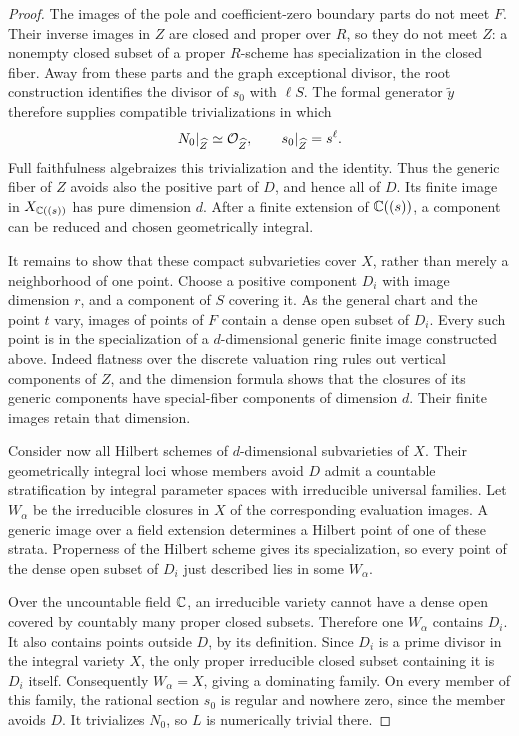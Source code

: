 \begin{proof}
The images of the pole and coefficient-zero boundary
parts do not meet $F$.  Their inverse images in $Z$ are
closed and proper over $R$, so they do not meet $Z$:
a nonempty closed subset of a proper $R$-scheme has
specialization in the closed fiber.  Away from these parts
and the graph exceptional divisor, the root construction
identifies the divisor of $s_0$ with $\ell S$.
The formal generator $\widetilde y$ therefore supplies
compatible trivializations in which
\[
 N_0|_{\widehat Z}\simeq\mathcal{O}_{\widehat Z},
 \qquad s_0|_{\widehat Z}=s^\ell.
\]
Full faithfulness algebraizes this trivialization and the
identity.  Thus the generic fiber of $Z$ avoids also the
positive part of $D$, and hence all of $D$.
Its finite image in $X_{\mathbb{C}((s))}$ has pure dimension $d$.
After a finite extension of $\mathbb{C}((s))$, a component can be
reduced and chosen geometrically integral.

It remains to show that these compact subvarieties cover
$X$, rather than merely a neighborhood of one point.
Choose a positive component $D_i$ with image dimension
$r$, and a component of $S$ covering it.  As the general
chart and the point $t$ vary, images of points of $F$
contain a dense open subset of $D_i$.
Every such point is in the specialization of a
$d$-dimensional generic finite image constructed above.
Indeed flatness over the discrete valuation ring rules
out vertical components of $Z$, and the dimension
formula shows that the closures of its generic
components have special-fiber components of dimension
$d$.  Their finite images retain that dimension.

Consider now all Hilbert schemes of $d$-dimensional
subvarieties of $X$.  Their geometrically integral loci
whose members avoid $D$ admit a countable stratification
by integral parameter spaces with irreducible universal
families.  Let $W_\alpha$ be the irreducible closures in
$X$ of the corresponding evaluation images.  A generic
image over a field extension determines a Hilbert point
of one of these strata.  Properness of the Hilbert scheme
gives its specialization, so every point of the dense
open subset of $D_i$ just described lies in some
$W_\alpha$.

Over the uncountable field $\mathbb{C}$, an irreducible variety
cannot have a dense open covered by countably many proper
closed subsets.  Therefore one $W_\alpha$ contains
$D_i$.  It also contains points outside $D$, by its
definition.  Since $D_i$ is a prime divisor in the
integral variety $X$, the only proper irreducible closed
subset containing it is $D_i$ itself.  Consequently
$W_\alpha=X$, giving a dominating family.
On every member of this family, the rational section
$s_0$ is regular and nowhere zero, since the member
avoids $D$.  It trivializes $N_0$, so $L$ is numerically
trivial there.
\end{proof}

